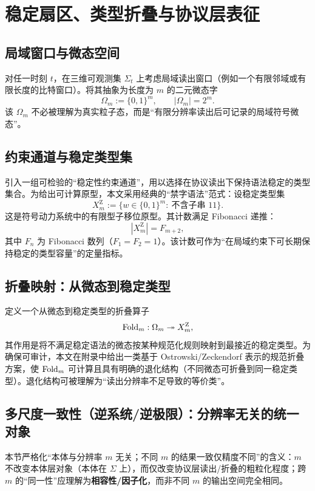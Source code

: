 \section{稳定扇区、类型折叠与协议层表征}

\subsection{局域窗口与微态空间}

对任一时刻 $t$，在三维可观测集 $\Sigma_t$ 上考虑局域读出窗口（例如一个有限邻域或有限长度的比特窗口）。将其抽象为长度为 $m$ 的二元微态字
\[
\Omega_m:=\{0,1\}^{m},\qquad |\Omega_m|=2^{m}.
\]
该 $\Omega_m$ 不必被理解为真实粒子态，而是“有限分辨率读出后可记录的局域符号微态”。

\subsection{约束通道与稳定类型集}

引入一组可检验的“稳定性约束通道”，用以选择在协议读出下保持语法稳定的类型集合。为给出可计算原型，本文采用经典的“禁字语法”范式：设稳定类型集
\[
X_m^{\mathrm Z}:=\Big\{w\in\{0,1\}^{m}:\ \text{不含子串 }11\Big\}.
\]
这是符号动力系统中的有限型子移位原型。其计数满足 Fibonacci 递推：
\[
|X_m^{\mathrm Z}|=F_{m+2},
\]
其中 $F_{n}$ 为 Fibonacci 数列（$F_1=F_2=1$）。该计数可作为“在局域约束下可长期保持稳定的类型容量”的定量指标。

\subsection{折叠映射：从微态到稳定类型}

定义一个从微态到稳定类型的折叠算子
\[
\mathrm{Fold}_m:\Omega_m \twoheadrightarrow X_m^{\mathrm Z},
\]
其作用是将不满足稳定语法的微态按某种规范化规则映射到最接近的稳定类型。为确保可审计，本文在附录中给出一类基于 Ostrowski/Zeckendorf 表示的规范折叠方案，使 $\mathrm{Fold}_m$ 可计算且具有明确的退化结构（不同微态可折叠到同一稳定类型）。退化结构可被理解为“读出分辨率不足导致的等价类”。

\subsection{多尺度一致性（逆系统/逆极限）：分辨率无关的统一对象}

本节严格化“本体与分辨率 $m$ 无关；不同 $m$ 的结果一致仅精度不同”的含义：$m$ 不改变本体层对象（本体在 $\Sigma$ 上），而仅改变协议层读出/折叠的粗粒化程度；跨 $m$ 的“同一性”应理解为\textbf{相容性/因子化}，而非不同 $m$ 的输出空间完全相同。

